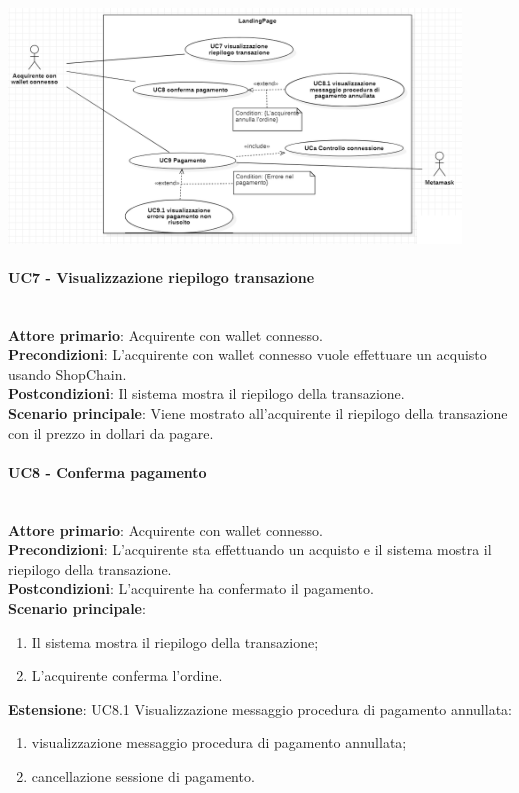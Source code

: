 \documentclass[a4paper, 12pt]{article}
\begin{document}
\includegraphics[width=0.9\textwidth]{UC_LP2}

\paragraph{UC7 - Visualizzazione riepilogo transazione}\\
\textbf{Attore primario}: Acquirente con wallet connesso.\\
\textbf{Precondizioni}: L'acquirente con wallet connesso vuole effettuare un acquisto usando ShopChain.\\
\textbf{Postcondizioni}: Il sistema mostra il riepilogo della transazione.\\
\textbf{Scenario principale}:
Viene mostrato all'acquirente il riepilogo della transazione con il prezzo in dollari da pagare.

\paragraph{UC8 - Conferma pagamento}\\
\textbf{Attore primario}: Acquirente con wallet connesso.\\
\textbf{Precondizioni}: L'acquirente sta effettuando un acquisto e il sistema mostra il riepilogo della transazione.\\
\textbf{Postcondizioni}: L'acquirente ha confermato il pagamento.\\
\textbf{Scenario principale}:
\begin{enumerate}
    \item Il sistema mostra il riepilogo della transazione;
    \item L'acquirente conferma l'ordine.
\end{enumerate}
\textbf{Estensione}:
UC8.1 Visualizzazione messaggio procedura di pagamento annullata:
\begin{enumerate}
    \item visualizzazione messaggio procedura di pagamento annullata;
    \item cancellazione sessione di pagamento.
\end{enumerate}
\end{document}
